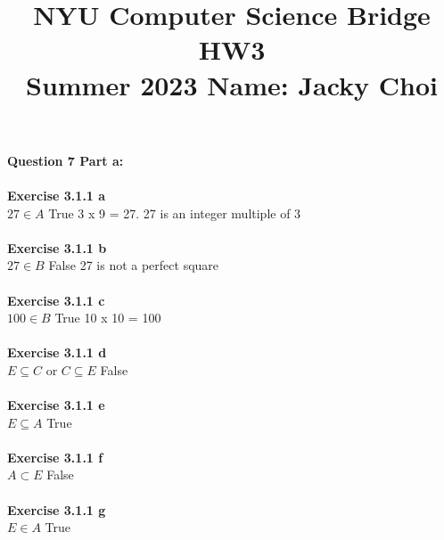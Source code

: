 \documentclass[11pt]{article}
\title{\textbf{NYU Computer Science Bridge HW3}\\
Summer 2023 Name: Jacky Choi}
\date{}
\begin{document}
\setul{}{2pt}
\maketitle

\noindent \textbf{Question 7 Part a:}\\\\
\textbf{Exercise 3.1.1 a }\\
$27 \in A$ True 3 x 9 = 27. 27 is an integer multiple of 3\\\\
\textbf{Exercise 3.1.1 b }\\
$27 \in B$ False 27 is not a perfect square\\\\
\textbf{Exercise 3.1.1 c }\\
$100 \in B$ True 10 x 10 = 100\\\\
\textbf{Exercise 3.1.1 d }\\
$E \subseteq C$ or $C \subseteq E$ False\\\\
\textbf{Exercise 3.1.1 e }\\
$E \subseteq A$ True\\\\
\textbf{Exercise 3.1.1 f }\\
$A \subset E$ False\\\\
\textbf{Exercise 3.1.1 g }\\
$E \in A$ True\\\\

\newpage
\end{document}
